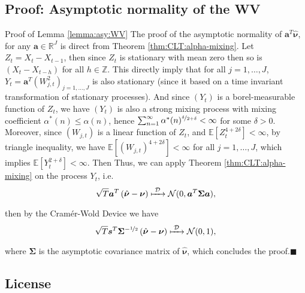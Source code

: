 \documentclass[envcountsect,usenames,dvipsnames]{beamer}
\theoremstyle{mystyle}
\begin{document}
\subsection{Proof: Asymptotic normality of the WV}
\label{proof:lemma:asy:WV}
\begin{frame}{Proof of Lemma \ref{lemma:asy:WV}}
\footnotesize
    The proof of the asymptotic normality of $\bm{a}^T \hat{\bm{\nu}}$, for any $\bm{a} \in \mathbb{R}^J$ is direct from Theorem \ref{thm:CLT:alpha-mixing}. Let $Z_t = X_t - X_{t-1}$, then since $Z_t$ is stationary with mean zero then so is $(X_t - X_{t-h})$ for all $h \in \mathbb{Z}$. This directly imply that for all $j = 1, \dots, J$, $Y_t = \bm{a}^T(W_{j, t}^2)_{j = 1, \dots, J}$ is also stationary (since it based on a time invariant transformation of stationary processes). And since $(Y_t)$ is a borel-measurable function of $Z_t$, we have $(Y_t)$ is also a strong mixing process with mixing coefficient $\alpha^{\ast}(n) \leq \alpha(n)$, hence $\sum_{n=1}^{\infty} \alpha^{\ast}(n)^{\nicefrac{\delta}{2+\delta}} < \infty$ for some $\delta > 0$. Moreover, since $(W_{j,t})$ is a linear function of $Z_t$, and $\mathbb{E}\left[Z_t^{4+2\delta}\right] < \infty$, by triangle inequality, we have $\mathbb{E}\left[(W_{j,t})^{4+2\delta}\right] < \infty$ for all $j = 1, \dots, J$, which implies $\mathbb{E}\left[Y_{t}^{2+\delta}\right] < \infty$. Then 
    Thus, we can apply Theorem \ref{thm:CLT:alpha-mixing} on the process $Y_t$, i.e.
%
\begin{equation*}
    \sqrt{T}\bm{a}^T\left(\hat{\bm{\nu}} - \bm{\nu} \right) \xmapsto[\;\;\;\;\; ]{\mathcal{D}} \mathcal{N}(0, \bm{a}^T\bm{\Sigma}\bm{a}),
\end{equation*}
%
then by the Cram\'er-Wold Device we have
%
\begin{equation*}
    \sqrt{T} \bm{s}^T \bm{\Sigma}^{-\nicefrac{1}{2}} \left(\hat{\bm{\nu}} - \bm{\nu} \right) \xmapsto[\;\;\;\;\; ]{\mathcal{D}} \mathcal{N}(0,1),
\end{equation*}
%
where $\bm{\Sigma}$ is the asymptotic covariance matrix of $\hat{\bm{\nu}}$, which concludes the proof.\hfill $\blacksquare$

\hyperlink{lemma:asy:WV}{}

\end{frame}

\subsection{License}
\end{document}

